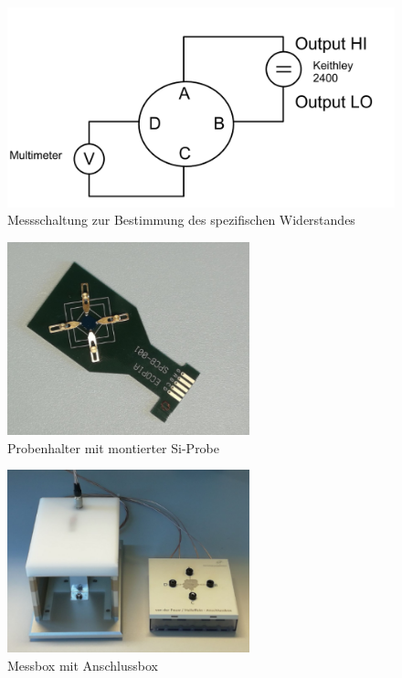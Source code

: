 \documentclass[a4paper]{scrartcl}
\numberwithin{equation}{subsection}
\begin{document}
\begin{figure}[H]
\includegraphics[width=12cm]{messchaltung_spezifischer_Widerstand}
\centering
\caption{Messschaltung zur Bestimmung des spezifischen Widerstandes \cite{anl}}
\centering
\label{fig:messchaltung-spezifischer-widerstand}
\end{figure}

\begin{figure}[H]
\includegraphics[width=7cm]{probehalter-mit-si}
\centering
\caption{Probenhalter mit montierter Si-Probe \cite{anl}}
\centering
\label{fig:probehalter-mit-si}
\end{figure}

\begin{figure}[H]
\includegraphics[width=7cm]{messbox_mit_anschluss}
\centering
\caption{Messbox mit Anschlussbox \cite{anl}}
\centering
\label{fig:messbox-mit-anschluss}
\end{figure}
\end{document}
